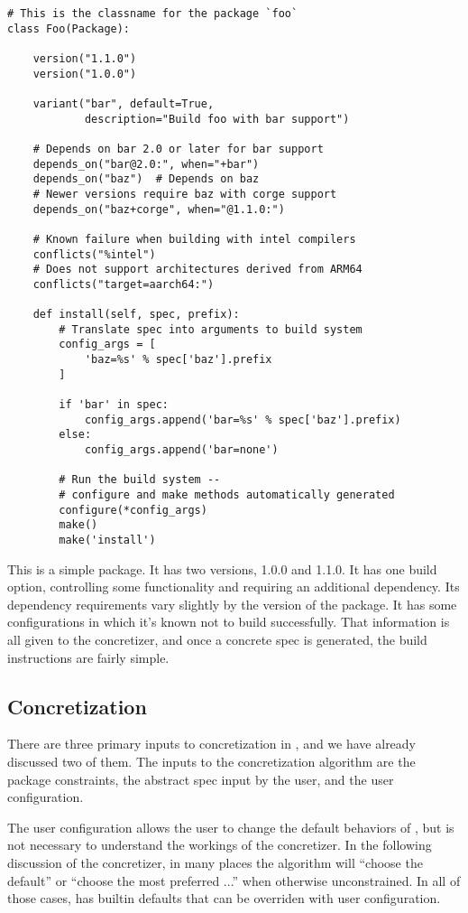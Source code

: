 \begin{verbatim}
# This is the classname for the package `foo`
class Foo(Package):

    version("1.1.0")
    version("1.0.0")

    variant("bar", default=True,
            description="Build foo with bar support")

    # Depends on bar 2.0 or later for bar support
    depends_on("bar@2.0:", when="+bar")
    depends_on("baz")  # Depends on baz
    # Newer versions require baz with corge support
    depends_on("baz+corge", when="@1.1.0:")

    # Known failure when building with intel compilers
    conflicts("%intel")
    # Does not support architectures derived from ARM64
    conflicts("target=aarch64:")

    def install(self, spec, prefix):
        # Translate spec into arguments to build system
        config_args = [
            'baz=%s' % spec['baz'].prefix
        ]

        if 'bar' in spec:
            config_args.append('bar=%s' % spec['baz'].prefix)
        else:
            config_args.append('bar=none')

        # Run the build system -- 
        # configure and make methods automatically generated
        configure(*config_args)
        make()
        make('install')
\end{verbatim}

This is a simple package. It has two versions, 1.0.0 and 1.1.0. It has one build option, controlling some functionality and requiring an additional dependency. Its dependency requirements vary slightly by the version of the package. It has some configurations in which it's known not to build successfully. That information is all given to the concretizer, and once a concrete spec is generated, the build instructions are fairly simple.

\subsection{Concretization}

There are three primary inputs to concretization in \spack{}, and we have already discussed two of them. The inputs to the concretization algorithm are the package constraints, the abstract spec input by the user, and the user configuration.

The user configuration allows the user to change the default behaviors of \spack{}, but is not necessary to understand the workings of the concretizer. In the following discussion of the concretizer, in many places the algorithm will ``choose the default'' or ``choose the most preferred ...'' when otherwise unconstrained. In all of those cases, \spack{} has builtin defaults that can be overriden with user configuration.

